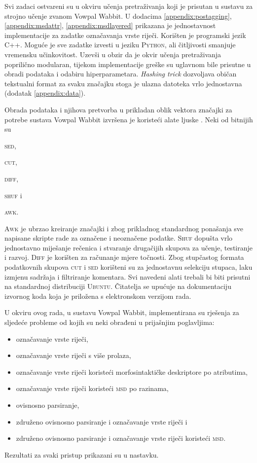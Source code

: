 Svi zadaci ostvareni su u okviru učenja pretraživanja koji je prisutan u
sustavu za strojno učenje zvanom Vowpal Wabbit. U dodacima
\ref{appendix:postagging}, \ref{appendix:msdattr}, \ref{appendix:msdlayered}
prikazana je jednostavnost implementacije za zadatke označavanja vrste riječi.
Korišten je programski jezik \textsc{C++}. Moguće je sve zadatke izvesti u
jeziku \textsc{Python}, ali čitljivosti smanjuje vremensku
učinkovitost. Uzevši u obzir da je okvir učenja pretraživanja poprilično
modularan, tijekom implementacije greške su uglavnom bile prisutne u
obradi podataka i odabiru hiperparametara. \textit{Hashing trick} dozvoljava
običan tekstualni format za svaku značajku stoga je ulazna datoteka vrlo
jednostavna (dodatak \ref{appendix:data}).

Obrada podataka i njihova pretvorba u prikladan oblik vektora značajki za
potrebe sustava Vowpal Wabbit izvršena je koristeći alate ljuske .
Neki od  bitnijih su
\begin{inlinelist}
  \item \textsc{sed},
  \item \textsc{cut},
  \item \textsc{diff},
  \item \textsc{shuf} i
  \item \textsc{awk}.
\end{inlinelist}
\textsc{Awk} je ubrzao kreiranje značajki i zbog prikladnog standardnog
ponašanja sve napisane skripte rade za označene i neoznačene podatke.
\textsc{Shuf} dopušta vrlo jednostavno miješanje rečenica i stvaranje drugačijih
skupova za učenje, testiranje i razvoj. \textsc{Diff} je korišten za računanje
mjere točnosti. Zbog stupčastog formata podatkovnih skupova \textsc{cut} i
\textsc{sed} korišteni su za jednostavnu selekciju stupaca, laku izmjenu
sadržaja i filtriranje komentara. Svi navedeni alati trebali bi biti prisutni na
standardnoj distribuciji \textsc{Ubuntu}. Čitatelja se upućuje na dokumentaciju
izvornog koda koja je priložena s elektronskom verzijom rada.

U okviru ovog rada, u sustavu Vowpal Wabbit, implementirana su rješenja za
sljedeće probleme od kojih su neki obrađeni u prijašnjim poglavljima:
\begin{itemize}
  \item označavanje vrste riječi,
  \item označavanje vrste riječi s više prolaza,
  \item označavanje vrste riječi koristeći morfosintaktičke deskriptore
   po atributima,
  \item označavanje vrste riječi koristeći \textsc{msd} po
  razinama,
  \item ovisnosno parsiranje,
  \item združeno ovisnosno parsiranje i označavanje vrste riječi i
  \item združeno ovisnosno parsiranje i označavanje vrste riječi koristeći
  \textsc{msd}.
\end{itemize}
Rezultati za svaki pristup prikazani su u nastavku.

